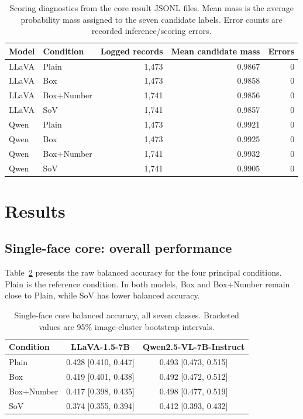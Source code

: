 \documentclass[lettersize,journal]{IEEEtran}
\begin{document}
\begin{table}[!t]
\caption{Scoring diagnostics from the core result JSONL files. Mean mass is the average probability mass assigned to the seven candidate labels. Error counts are recorded inference/scoring errors.}
\label{tab:scoringvalidity}
\centering
\footnotesize
\begin{tabular}{llrrr}
\toprule
Model & Condition & Logged records & Mean candidate mass & Errors \\
\midrule
LLaVA & Plain & 1,473 & 0.9867 & 0 \\
LLaVA & Box & 1,473 & 0.9858 & 0 \\
LLaVA & Box+Number & 1,741 & 0.9856 & 0 \\
LLaVA & SoV & 1,741 & 0.9857 & 0 \\
Qwen & Plain & 1,473 & 0.9921 & 0 \\
Qwen & Box & 1,473 & 0.9925 & 0 \\
Qwen & Box+Number & 1,741 & 0.9932 & 0 \\
Qwen & SoV & 1,741 & 0.9905 & 0 \\
\bottomrule
\end{tabular}
\end{table}


\section{Results}
\subsection{Single-face core: overall performance}
Table~\ref{tab:core} presents the raw balanced accuracy for the four principal conditions. Plain is the reference condition. In both models, Box and Box+Number remain close to Plain, while SoV has lower balanced accuracy.

\begin{table}[!t]
\caption{Single-face core balanced accuracy, all seven classes. Bracketed values are 95\% image-cluster bootstrap intervals.}
\label{tab:core}
\centering
\footnotesize
\begin{tabular}{lcc}
\toprule
Condition & LLaVA-1.5-7B & Qwen2.5-VL-7B-Instruct \\
\midrule
Plain & 0.428 [0.410, 0.447] & 0.493 [0.473, 0.515] \\
Box & 0.419 [0.401, 0.438] & 0.492 [0.472, 0.512] \\
Box+Number & 0.417 [0.398, 0.435] & 0.498 [0.477, 0.519] \\
SoV & 0.374 [0.355, 0.394] & 0.412 [0.393, 0.432] \\
\bottomrule
\end{tabular}
\end{table}
\end{document}
